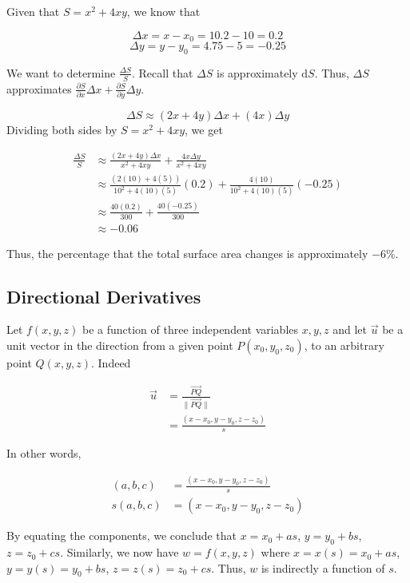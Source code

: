 \documentclass[11pt]{article}
\theoremstyle{plain} %
\theoremstyle{definition}
\theoremstyle{example}
\theoremstyle{remark}
\begin{document}
Given that $S = x^2 + 4xy$, we know that 

$$\Delta x = x-x_0 = 10.2 - 10 = 0.2$$
$$\Delta y = y - y_0 = 4.75-5=-0.25$$ 

We want to determine $\frac{\Delta S}{S}$. Recall that $\Delta S$ is approximately $\mathrm d S$. Thus, $\Delta S$ approximates $\frac{\partial S}{\partial x}\Delta x + \frac{\partial S}{\partial y}\Delta y$.

$$\Delta S \approx (2x+4y)\Delta x + (4x)\Delta y$$
Dividing both sides by $S = x^2 + 4xy$, we get


\begin{align*}
	\frac{\Delta S}{S} &\approx \frac{(2x+4y)\Delta x}{x^2 + 4xy} + \frac{4x\Delta y}{x^2 + 4xy}\\
	&\approx \frac{\left(2(10)+4(5)\right)}{10^2 + 4(10)(5)}\left(0.2\right) + \frac{4(10)}{10^2 + 4(10)(5)}\left(-0.25\right)\\
	&\approx \frac{40(0.2)}{300}+\frac{40(-0.25)}{300}\\
	&\approx -0.06
\end{align*}

Thus, the percentage that the total surface area changes is approximately $-6\%$. 

\subsection{Directional Derivatives}

Let $f(x, y, z)$ be a function of three independent variables $x, y, z$ and let $\vec{u}$ be a unit vector in the direction from a given point $P(x_0, y_0, z_0)$, to an arbitrary point $Q(x, y, z)$. Indeed 

\begin{align*}
	\vec{u} &= \frac{\vec{PQ}}{\| \vec{PQ}\|}\\
	&=\frac{(x-x_0, y-y_0, z-z_0)}{s}
\end{align*}

In other words, 

\begin{align*}
	(a, b, c)  &= \frac{(x-x_0, y-y_0, z-z_0)}{s}\\
	s(a, b, c) &=(x-x_0, y-y_0, z-z_0)
\end{align*}

By equating the components, we conclude that $x = x_0+as$, $y = y_0 + bs$, $z=z_0 + cs$. Similarly, we now have $w = f(x, y, z)$ where $x = x(s) = x_0+as$, $y = y(s) = y_0 + bs$, $z=z(s) = z_0 + cs$. Thus, $w$ is indirectly a function of $s$. 
\end{document}
